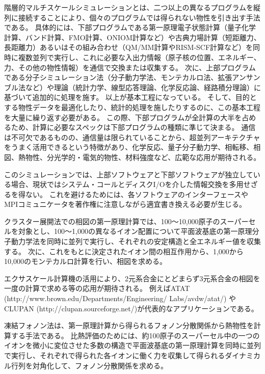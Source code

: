 \label{sec:4-2_要求性能_マルチスケール}
階層的マルチスケールシミュレーションとは、二つ以上の異なるプログラムを縦列に接続することにより、個々のプログラムでは得られない物性を引き出す手法である。
具体的には、下部プログラムである第一原理電子状態計算（量子化学計算、バンド計算、FMO計算、ONIOM計算など）や古典力場計算（短距離力、長距離力）あるいはその組み合わせ（QM/MM計算やRISM-SCF計算など）を同時に複数並列で実行し、これに必要な入出力情報（原子核の位置、エネルギー、力、その他の物性情報）を通信で交換または収集する。
次に、上部プログラムである分子シミュレーション法（分子動力学法、モンテカルロ法、拡張アンサンブル法など）や理論（統計力学、線型応答理論、化学反応論、経路積分理論）に基づいて追加的に処理を施す。
以上が基本工程になっている。
そして、目的とする物性データを最適化したり、統計的処理を施したりするのに、この基本工程を大量に繰り返す必要がある。
この際、下部プログラムが全計算の大半を占めるため、計算に必要なスペックは下部プログラムの種類に準じて決まる。
通信は不可欠であるものの、通信量は限られていることから、超並列アーキテクチャをうまく活用できるという特徴があり、化学反応、量子分子動力学、相転移、相図、熱物性、分光学的・電気的物性、材料強度など、広範な応用が期待される。

このシミュレーションでは、上部ソフトウェアと下部ソフトウェアが独立している場合、現状ではシステム・コールとディスクI/Oを介した情報交換を多用せざるを得ない。
これを避けるためには、各ソフトウェアのインターフェースやMPIコミュニケータを著作権に注意しながら適宜書き換える必要が生じる。


クラスター展開法での相図の第一原理計算では、100～10,000原子のスーパーセルを対象とし、100～1,000の異なるイオン配置について平面波基底の第一原理分子動力学法を同時に並列で実行し、それぞれの安定構造と全エネルギー値を収集する。
次に、これをもとに決定されたイオン間の相互作用から、1,000から10,000のモンテカルロ計算を行い、相図を求める。

エクサスケール計算機の活用により、2元系合金にとどまらず3元系合金の相図を一度の計算で求める等の応用が期待される。
例えばATAT (http://www.brown.edu/Departments/Engineering/ Labs/avdw/atat/) やCLUPAN (http://clupan.sourceforge.net/)が代表的なアプリケーションである。


凍結フォノン法は、第一原理計算から得られるフォノン分散関係から熱物性を計算する手法である。
比熱評価のためには、約100原子のスーパーセル中の一つのイオンを微小に変位させた多数の構造で平面波基底の第一原理計算を同時に並列で実行し、それぞれで得られた各イオンに働く力を収集して得られるダイナミカル行列を対角化して、フォノン分散関係を求める。


